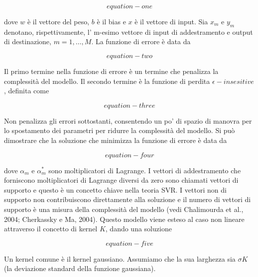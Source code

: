 \documentclass[12pt,a4paper]{report}
\begin{document}
\begin{equation}
equation-one
\end{equation}

dove $w$ è il vettore del peso, $b$ è il bias e $x$ è il vettore di input. Sia $x_m$ e $y_m$ denotano, rispettivamente, l’ m-esimo vettore di input di addestramento e output di destinazione, $m = 1, …, M$. La funzione di errore è data da 

\begin{equation}
equation-two
\end{equation}

Il primo termine nella funzione di errore è un termine che penalizza la complessità del modello. Il secondo termine è la funzione di perdita $\epsilon-insesitive$, definita come

\begin{equation}
equation-three
\end{equation}

Non penalizza gli errori sottostanti, consentendo un po' di spazio di manovra per lo spostamento dei parametri per ridurre la complessità del modello. Si può dimostrare che la soluzione che minimizza la funzione di errore è data da

\begin{equation}
equation-four
\end{equation}

dove $\alpha_m$ e $\alpha_m^\ast$ sono moltiplicatori di Lagrange. I vettori di addestramento che forniscono moltiplicatori di Lagrange diversi da zero sono chiamati vettori di supporto e questo è un concetto chiave nella teoria SVR. I vettori non di supporto non contribuiscono direttamente alla soluzione e il numero di vettori di supporto è una misura della complessità del modello (vedi Chalimourda et al., 2004; Cherkassky e Ma, 2004). Questo modello viene esteso al caso non lineare attraverso il concetto di kernel $K$, dando una soluzione

\begin{equation}
equation-five
\end{equation}

Un kernel comune è il kernel gaussiano. Assumiamo che la sua larghezza sia $\sigma K$ (la deviazione standard della funzione gaussiana).
\end{document}
